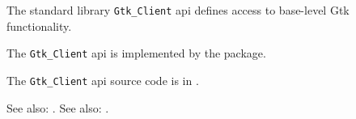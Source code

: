 
The standard library {\tt Gtk\_Client} api defines access to base-level Gtk functionality.

The {\tt Gtk\_Client} api is implemented by the  package.

The {\tt Gtk\_Client} api source code is in .

See also:  .
See also:  .





